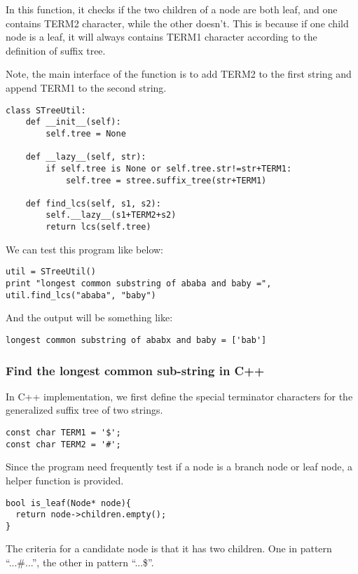\documentclass{article}
\begin{document}
In this function, it checks if the two children of a node
are both leaf, and one contains TERM2 character, while the 
other doesn't. This is because
if one child node is a leaf, it will always contains TERM1
character according to the definition of suffix tree.

Note, the main interface of the function is to add TERM2 to 
the first string and append TERM1 to the second string.

\begin{lstlisting}
class STreeUtil:
    def __init__(self):
        self.tree = None

    def __lazy__(self, str):
        if self.tree is None or self.tree.str!=str+TERM1:
            self.tree = stree.suffix_tree(str+TERM1)

    def find_lcs(self, s1, s2):
        self.__lazy__(s1+TERM2+s2)
        return lcs(self.tree)
\end{lstlisting}

We can test this program like below:

\begin{lstlisting}
util = STreeUtil()
print "longest common substring of ababa and baby =", util.find_lcs("ababa", "baby")
\end{lstlisting}

And the output will be something like:
\begin{verbatim}
longest common substring of ababx and baby = ['bab']
\end{verbatim}

\subsubsection*{Find the longest common sub-string in C++}
In C++ implementation, we first define the special terminator
characters for the generalized suffix tree of two strings.

\lstset{language=C++}
\begin{lstlisting}
const char TERM1 = '$';
const char TERM2 = '#';
\end{lstlisting} %

Since the program need frequently test if a node is a branch
node or leaf node, a helper function is provided.

\begin{lstlisting}
bool is_leaf(Node* node){
  return node->children.empty();
}
\end{lstlisting}

The criteria for a candidate node is that it has two children.
One in pattern ``...\#...'', the other in pattern ``...\$''. 
\end{document}
